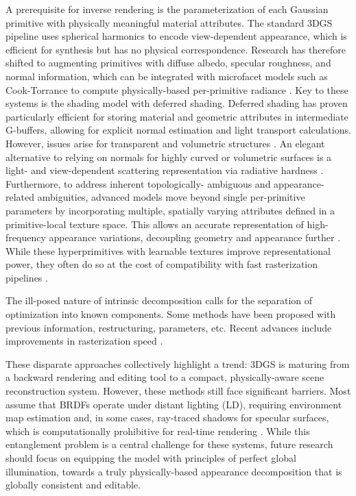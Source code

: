 \documentclass[11pt,a4paper]{article}
\begin{document}
A prerequisite for inverse rendering is the parameterization of each Gaussian primitive with physically meaningful material attributes. The standard 3DGS pipeline uses spherical harmonics to encode view-dependent appearance, which is efficient for synthesis but has no physical correspondence. Research has therefore shifted to augmenting primitives with diffuse albedo, specular roughness, and normal information, which can be integrated with microfacet models such as Cook-Torrance to compute physically-based per-primitive radiance \cite{arxiv:2408.13370v1}. Key to these systems is the shading model with deferred shading. Deferred shading has proven particularly efficient for storing material and geometric attributes in intermediate G-buffers, allowing for explicit normal estimation and light transport calculations. However, issues arise for transparent and volumetric structures \cite{arxiv:2403.17888v1}. An elegant alternative to relying on normals for highly curved or volumetric surfaces is a light- and view-dependent scattering representation via radiative hardness \cite{arxiv:2408.13370v1}. Furthermore, to address inherent topologically- ambiguous and appearance-related ambiguities, advanced models move beyond single per-primitive parameters by incorporating multiple, spatially varying attributes defined in a primitive-local texture space. This allows an accurate representation of high-frequency appearance variations, decoupling geometry and appearance further \cite{arxiv:2506.13348v2,arxiv:2409.12954v1}. While these hyperprimitives with learnable textures improve representational power, they often do so at the cost of compatibility with fast rasterization pipelines \cite{arxiv:2411.18966v2}.

The ill-posed nature of intrinsic decomposition calls for the separation of optimization into known components. Some methods have been proposed with previous information, restructuring, parameters, etc. Recent advances include improvements in rasterization speed \cite{arxiv:2605.04844v1}.

These disparate approaches collectively highlight a trend: 3DGS is maturing from a backward rendering and editing tool to a compact, physically-aware scene reconstruction system. However, these methods still face significant barriers. Most assume that BRDFs operate under distant lighting (LD), requiring environment map estimation and, in some cases, ray-traced shadows for specular surfaces, which is computationally prohibitive for real-time rendering \cite{arxiv:2503.12284v1,arxiv:2512.08334v3}. While this entanglement problem is a central challenge for these systems, future research should focus on equipping the model with principles of perfect global illumination, towards a truly physically-based appearance decomposition that is globally consistent and editable.
\end{document}

